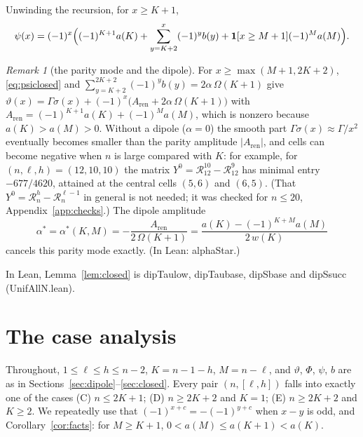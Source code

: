 \documentclass[11pt]{amsart}
\theoremstyle{definition}
\theoremstyle{remark}
\newtheorem{remark}[lemma]{Remark}
\numberwithin{equation}{section}
\newcommand{\ind}[1]{\mathbf{1}[#1]}
\newcommand{\cR}{\mathcal{R}}
\newcommand{\leanus}{\textunderscore\allowbreak}
\newcommand{\lean}[1]{{\ttfamily\let\_\leanus #1}}
\begin{document}
Unwinding the recursion, for $x\ge K+1$,
\begin{equation}\label{eq:psiclosed}
  \psi(x)=(-1)^x\Bigl((-1)^{K+1}a(K)+\sum_{y=K+2}^{x}(-1)^yb(y)+\ind{x\ge M+1}(-1)^Ma(M)\Bigr).
\end{equation}

\begin{remark}[the parity mode and the dipole]\label{rem:parity}
For $x\ge\max(M+1,2K+2)$, \eqref{eq:psiclosed} and $\sum_{y=K+2}^{2K+2}(-1)^yb(y)=2\alpha\,\Omega(K+1)$ give
$\vartheta(x)=\Gamma\sigma(x)+(-1)^x\bigl(A_{\mathrm{ren}}+2\alpha\,\Omega(K+1)\bigr)$ with
$A_{\mathrm{ren}}=(-1)^{K+1}a(K)+(-1)^Ma(M)$, which is nonzero because $a(K)>a(M)>0$. Without a dipole
($\alpha=0$) the smooth part $\Gamma\sigma(x)\approx\Gamma/x^2$ eventually becomes smaller than the parity
amplitude $|A_{\mathrm{ren}}|$, and cells can become negative when $n$ is large compared with $K$: for
example, for $(n,\ell,h)=(12,10,10)$ the matrix $Y^0=\cR^{10}_{12}-\cR^{9}_{12}$ has minimal entry
$-677/4620$, attained at the central cells $(5,6)$ and $(6,5)$. (That $Y^0=\cR^h_n-\cR^{\ell-1}_n$ in
general is not needed; it was checked for $n\le20$, Appendix~\ref{app:checks}.) The dipole amplitude
\begin{equation}\label{eq:alphastar}
  \alpha^*=\alpha^*(K,M)=-\frac{A_{\mathrm{ren}}}{2\,\Omega(K+1)}=\frac{a(K)-(-1)^{K+M}a(M)}{2\,w(K)}
\end{equation}
cancels this parity mode exactly. (In Lean: \lean{alphaStar}.)
\end{remark}

In Lean, Lemma~\ref{lem:closed} is \lean{dipTau\_low}, \lean{dipTau\_base}, \lean{dipS\_base} and
\lean{dipS\_succ} (\lean{UnifAllN.lean}).

\section{The case analysis}\label{sec:cases}

Throughout, $1\le\ell\le h\le n-2$, $K=n-1-h$, $M=n-\ell$, and $\vartheta$, $\Phi$, $\psi$, $b$ are as in
Sections~\ref{sec:dipole}--\ref{sec:closed}. Every pair $(n,[\ell,h])$ falls into exactly one of the cases
(C) $n\le2K+1$; (D) $n\ge2K+2$ and $K=1$; (E) $n\ge2K+2$ and $K\ge2$. We repeatedly use that
$(-1)^{x+c}=-(-1)^{y+c}$ when $x-y$ is odd, and Corollary~\ref{cor:facts}: for $M\ge K+1$,
$0<a(M)\le a(K+1)<a(K)$.
\end{document}
